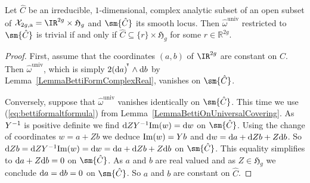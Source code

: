 \begin{corollary}
\notready\label{CorBettiFormVanishingDirection}
  Let $\hat{C}$ be an irreducible, $1$-dimensional, complex analytic
  subset of an open subset of $\mathcal X_{2g,\mathrm{a}}
  = \IR^{2g} \times \mathfrak{H}_g$ and $\sm{\hat {C}}$ its smooth
  locus. Then $\hat{\omega}^{\mathrm{univ}}$ restricted to $\sm{\hat C}$
  is trivial if and only if
  $\hat{C} \subseteq \{r\} \times \mathfrak{H}_g$ for some
  $r \in \mathbb R^{2g}$.
\end{corollary}
\begin{proof}
  First, assume that the coordinates $(a,b)$ of $\IR^{2g}$ are constant on
  $\hat C$. Then $\hat{\omega}^{\mathrm{univ}}$, which is simply
  $2 {{(\mathrm{d} a)}}^{\!^{\intercal}} \wedge \mathrm{d}b$ by
  Lemma~\ref{LemmaBettiFormComplexReal}, vanishes on $\sm{\hat C}$.

  Conversely, suppose that $\hat{\omega}^{\mathrm{univ}}$ vanishes
  identically on $\sm{\hat C}$. This time we use (\ref{eq:bettiformaltformula}) from
  Lemma~\ref{LemmaBettiOnUniversalCovering}. As $Y^{-1}$ is positive
  definite we find $\mathrm{d} Z Y^{-1} \mathrm{Im}(w) = \mathrm{d} w$ on $\sm{\hat C}$.
  Using the change of coordinates $w = a+Zb$ we deduce $\mathrm{Im}(w) = Y b$
  and $\mathrm{d} w = \mathrm{d} a
  + \mathrm{d} Z b +Z\mathrm{d} b$. So $\mathrm{d} Z b  =\mathrm{d} Z Y^{-1} \mathrm{Im}(w)
  = \mathrm{d} w=  \mathrm{d} a
  + \mathrm{d} Z b + Z\mathrm{d} b$ on $\sm{\hat C}$. This equality simplifies to
  $\mathrm{d} a + Z \mathrm{d} b = 0$ on $\sm{\hat C}$. As $a$ and $b$ are real
  valued and as $Z\in \mathfrak{H}_g$ we conclude $\mathrm{d} a = \mathrm{d} b =0$
  on $\sm{\hat C}$. So $a$ and $b$ are constant on $\hat C$.
\end{proof}


